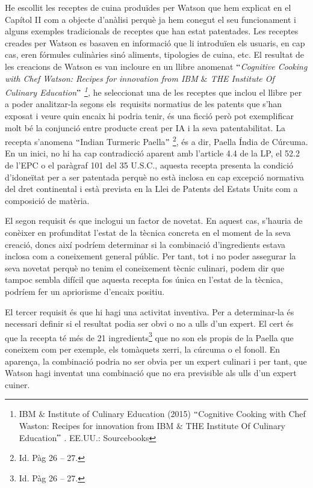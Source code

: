 \documentclass[12pt]{article}
\begin{document}
\vspace{\baselineskip}
\begin{justify}
He escollit les receptes de cuina produïdes per Watson que hem explicat en el Capítol II com a objecte d’anàlisi perquè ja hem conegut el seu funcionament i alguns exemples tradicionals de receptes que han estat patentades.  Les receptes creades per Watson es basaven en informació que li introduïen els usuaris, en cap cas, eren fórmules culinàries sinó aliments, tipologies de cuina, etc. El resultat de les creacions de Watson es van incloure en un llibre anomenat \textit{$``$Cognitive Cooking with Chef Watson: Recipes for innovation from IBM $\&$  THE Institute Of Culinary Education$"$ \footnote{ IBM $\&$  Institute of Culinary Education (2015) $``$Cognitive Cooking with Chef Waston: Recipes for innovation from IBM $\&$  THE Institute Of Culinary Education$"$ . EE.UU.: Sourcebooks }, }he seleccionat una de les receptes que inclou el llibre per a poder analitzar-la segons els\ requisits normatius  de les patents que s’han exposat i veure quin encaix hi podria tenir, és una ficció però pot exemplificar molt bé la conjunció entre producte creat per IA i la seva patentabilitat. La recepta s’anomena $``$Indian Turmeric Paella$"$ \footnote{ Id. Pàg 26 – 27. }, és a dir, Paella Índia de Cúrcuma. En un inici, no hi ha cap contradicció aparent amb l’article 4.4 de la LP, el 52.2 de l’EPC o el paràgraf 101 del 35 U.S.C., aquesta recepta presenta la condició d’idoneïtat per a ser patentada perquè no està inclosa en cap excepció normativa del dret continental i està prevista en la Llei de Patents del Estats Units com a composició de matèria. 
\end{justify}\par


\vspace{\baselineskip}
\begin{justify}
El segon requisit és que inclogui un factor de novetat. En aquest cas, s’hauria de conèixer en profunditat l’estat de la tècnica concreta en el moment de la seva creació, doncs així podríem determinar si la combinació d’ingredients estava inclosa com a coneixement general públic. Per tant, tot i no poder assegurar la seva novetat perquè no tenim el coneixement tècnic culinari, podem dir que tampoc sembla difícil que aquesta recepta fos única en l’estat de la tècnica, podríem fer un apriorisme d’encaix positiu.
\end{justify}\par


\vspace{\baselineskip}
\begin{justify}
El tercer requisit és que hi hagi una activitat inventiva. Per a determinar-la és necessari definir si el resultat podia ser obvi o no a ulls d’un expert. El cert és que la recepta té més de 21 ingredients\footnote{ Id. Pàg 26 – 27. } que no son els propis de la Paella que coneixem com per exemple, els tomàquets xerri, la cúrcuma o el fonoll. En aparença, la combinació podria no ser obvia per un expert culinari i per tant, que Watson hagi inventat una combinació que no era previsible als ulls d’un expert cuiner.
\end{justify}\par
\end{document}
